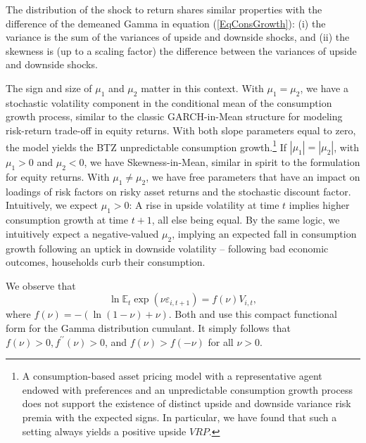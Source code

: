 \documentclass[11pt]{article}
\begin{document}
The distribution of the shock to return shares similar properties with the difference of the demeaned Gamma in equation (\ref{EqConsGrowth}): (i) the variance is the sum of the variances of upside and downside shocks, and (ii) the skewness is (up to a scaling factor) the difference between the variances of upside and downside shocks.

The sign and size of $\mu _{1}$ and $\mu _{2}$ matter in this
context. With $\mu _{1}=\mu _{2}$, we have a stochastic volatility component in the conditional mean of the consumption growth process, similar to the classic GARCH-in-Mean
structure for modeling risk-return trade-off in equity returns. With both slope parameters equal to zero,
the model yields the BTZ unpredictable consumption growth.\footnote{A consumption-based asset pricing model with a representative agent endowed with \cite{EZ89Econometrica} preferences and an unpredictable consumption growth process does not support the existence of distinct upside and downside variance risk premia with the expected signs. In particular, we have found that such a setting always yields a positive upside $VRP$.} If $|\mu
_{1}|=|\mu _{2}|$, with $\mu _{1}>0$ and $\mu_2<0$, we have Skewness-in-Mean, similar in
spirit to the \cite{FJPT13RoF} formulation for equity returns. With $\mu
_{1}\neq \mu _{2}$, we have free parameters that have an impact on loadings
of risk factors on risky asset returns and the stochastic discount factor. Intuitively, we expect $\mu_1>0$: A rise in upside volatility at time $t$ implies higher consumption growth at time $t+1$, all else being equal. By the same logic, we intuitively expect a negative-valued $\mu_2$, implying an expected fall in consumption growth following an uptick in downside volatility -- following bad economic outcomes, households curb their consumption.%

We observe that
\begin{equation}  \label{EqDefGammaCommulantExpectation}
\ln\mathbb{E}_t\exp\left(\nu \varepsilon_{i, t+1}\right)=f(\nu)V_{i,t},
\end{equation}
where $f(\nu)=-(\ln(1-\nu)+\nu)$. Both \cite{BekaertEngstromErmolov14JEc} and \cite{ShaliastovichYaronSegal14} use this compact functional form for the Gamma distribution cumulant. It simply follows that $f(\nu)>0, f^{\prime\prime }(\nu)>0$, and $f(\nu)>f(-\nu)$ for all $\nu>0$.
\end{document}
